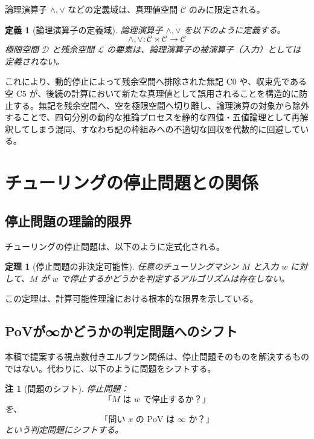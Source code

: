 \documentclass[11pt,a4paper]{article}
\newtheorem{definition}{定義}
\newtheorem{theorem}{定理}
\newtheorem{remark}{注}
\newcommand{\C}{\mathcal{C}}
\newcommand{\Lspace}{\mathcal{L}}
\newcommand{\Czero}{\text{C0}}
\newcommand{\Cfive}{\text{C5}}
\begin{document}
論理演算子 $\land, \lor$ などの定義域は、真理値空間 $\C$ のみに限定される。

\begin{definition}[論理演算子の定義域]
論理演算子 $\land, \lor$ を以下のように定義する。
\[
\land, \lor : \C \times \C \to \C
\]
極限空間 $\mathcal{D}$ と残余空間 $\Lspace$ の要素は、論理演算子の被演算子（入力）としては定義されない。
\end{definition}

これにより、動的停止によって残余空間へ排除された無記 $\Czero$ や、収束先である空 $\Cfive$ が、後続の計算において新たな真理値として誤用されることを構造的に防止する。無記を残余空間へ、空を極限空間へ切り離し、論理演算の対象から除外することで、四句分別の動的な推論プロセスを静的な四値・五値論理として再解釈してしまう混同、すなわち記の枠組みへの不適切な回収を代数的に回避している。

\section{チューリングの停止問題との関係}
\label{sec:halting}

\subsection{停止問題の理論的限界}
\label{subsec:halting-limit}

チューリングの停止問題は、以下のように定式化される。

\begin{theorem}[停止問題の非決定可能性]
任意のチューリングマシン $M$ と入力 $w$ に対して、$M$ が $w$ で停止するかどうかを判定するアルゴリズムは存在しない。
\end{theorem}

この定理は、計算可能性理論における根本的な限界を示している。

\subsection{PoVが∞かどうかの判定問題へのシフト}
\label{subsec:pov-infinity}

本稿で提案する視点数付きエルブラン関係は、停止問題そのものを解決するものではない。代わりに、以下のように問題をシフトする。

\begin{remark}[問題のシフト]
停止問題：
\[
\text{「$M$ は $w$ で停止するか？」}
\]
を、
\[
\text{「問い $x$ の PoV は ∞ か？」}
\]
という判定問題にシフトする。
\end{remark}
\end{document}

